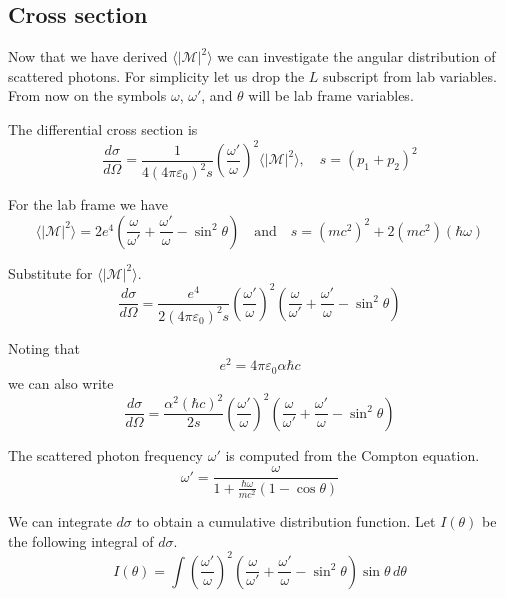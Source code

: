 \documentclass[12pt]{article}
\begin{document}
\subsection*{Cross section}
Now that we have derived $\langle|\mathcal{M}|^2\rangle$
we can investigate the angular distribution of scattered photons.
For simplicity let us drop the $L$ subscript from lab variables.
From now on the symbols $\omega$, $\omega'$, and $\theta$ will be lab frame variables.

\bigskip
The differential cross section is
\begin{equation*}
\frac{d\sigma}{d\Omega}=\frac{1}{4(4\pi\varepsilon_0)^2s}
\left(\frac{\omega'}{\omega}\right)^2\langle|\mathcal{M}|^2\rangle,\quad s=(p_1+p_2)^2
\end{equation*}

For the lab frame we have
\begin{equation*}
\langle|\mathcal{M}|^2\rangle
=2e^4\left(
\frac{\omega}{\omega'}+\frac{\omega'}{\omega}-\sin^2\theta
\right)
\quad\text{and}\quad
s=(mc^2)^2+2(mc^2)(\hbar\omega)
\end{equation*}

Substitute for $\langle|\mathcal{M}|^2\rangle$.
\begin{equation*}
\frac{d\sigma}{d\Omega}
=\frac{e^4}{2(4\pi\varepsilon_0)^2s}
\left(\frac{\omega'}{\omega}\right)^2
\left(
\frac{\omega}{\omega'}+\frac{\omega'}{\omega}-\sin^2\theta
\right)
\end{equation*}

Noting that
\begin{equation*}
e^2=4\pi\varepsilon_0\alpha\hbar c
\end{equation*}
we can also write
\begin{equation*}
\frac{d\sigma}{d\Omega}
=\frac{\alpha^2(\hbar c)^2}{2s}
\left(\frac{\omega'}{\omega}\right)^2
\left(
\frac{\omega}{\omega'}+\frac{\omega'}{\omega}-\sin^2\theta
\right)
\end{equation*}

The scattered photon frequency $\omega'$ is computed from the Compton equation.
\begin{equation*}
\omega'=\frac{\omega}{1+\frac{\hbar\omega}{mc^2}(1-\cos\theta)}
\end{equation*}

We can integrate $d\sigma$ to obtain a cumulative distribution function.
Let $I(\theta)$ be the following integral of $d\sigma$.
\begin{equation*}
I(\theta)=
\int
\left(\frac{\omega'}{\omega}\right)^2
\left(\frac{\omega}{\omega'}+\frac{\omega'}{\omega}-\sin^2\theta\right)
\sin\theta\,d\theta
\end{equation*}
\end{document}
